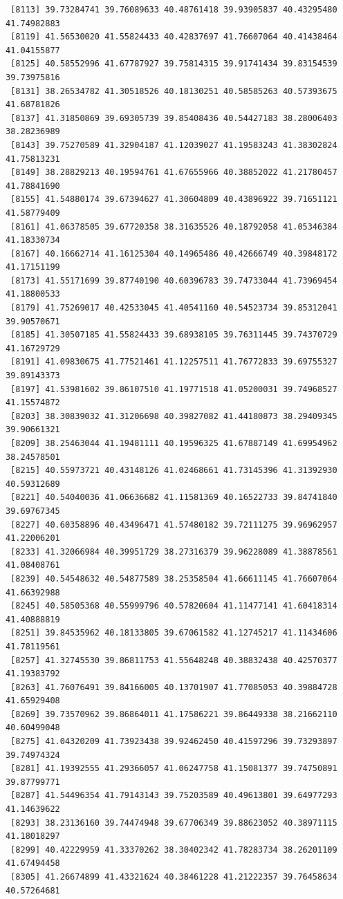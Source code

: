 \documentclass[
  letterpaper,
  DIV=11,
  numbers=noendperiod]{scrartcl}
\begin{document}
\begin{verbatim}
 [8113] 39.73284741 39.76089633 40.48761418 39.93905837 40.43295480 41.74982883
 [8119] 41.56530020 41.55824433 40.42837697 41.76607064 40.41438464 41.04155877
 [8125] 40.58552996 41.67787927 39.75814315 39.91741434 39.83154539 39.73975816
 [8131] 38.26534782 41.30518526 40.18130251 40.58585263 40.57393675 41.68781826
 [8137] 41.31850869 39.69305739 39.85408436 40.54427183 38.28006403 38.28236989
 [8143] 39.75270589 41.32904187 41.12039027 41.19583243 41.38302824 41.75813231
 [8149] 38.28829213 40.19594761 41.67655966 40.38852022 41.21780457 41.78841690
 [8155] 41.54880174 39.67394627 41.30604809 40.43896922 39.71651121 41.58779409
 [8161] 41.06378505 39.67720358 38.31635526 40.18792058 41.05346384 41.18330734
 [8167] 40.16662714 41.16125304 40.14965486 40.42666749 40.39848172 41.17151199
 [8173] 41.55171699 39.87740190 40.60396783 39.74733044 41.73969454 41.18800533
 [8179] 41.75269017 40.42533045 41.40541160 40.54523734 39.85312041 39.90570671
 [8185] 41.30507185 41.55824433 39.68938105 39.76311445 39.74370729 41.16729729
 [8191] 41.09830675 41.77521461 41.12257511 41.76772833 39.69755327 39.89143373
 [8197] 41.53981602 39.86107510 41.19771518 41.05200031 39.74968527 41.15574872
 [8203] 38.30839032 41.31206698 40.39827082 41.44180873 38.29409345 39.90661321
 [8209] 38.25463044 41.19481111 40.19596325 41.67887149 41.69954962 38.24578501
 [8215] 40.55973721 40.43148126 41.02468661 41.73145396 41.31392930 40.59312689
 [8221] 40.54040036 41.06636682 41.11581369 40.16522733 39.84741840 39.69767345
 [8227] 40.60358896 40.43496471 41.57480182 39.72111275 39.96962957 41.22006201
 [8233] 41.32066984 40.39951729 38.27316379 39.96228089 41.38878561 41.08408761
 [8239] 40.54548632 40.54877589 38.25358504 41.66611145 41.76607064 41.66392988
 [8245] 40.58505368 40.55999796 40.57820604 41.11477141 41.60418314 41.40888819
 [8251] 39.84535962 40.18133805 39.67061582 41.12745217 41.11434606 41.78119561
 [8257] 41.32745530 39.86811753 41.55648248 40.38832438 40.42570377 41.19383792
 [8263] 41.76076491 39.84166005 40.13701907 41.77085053 40.39884728 41.65929408
 [8269] 39.73570962 39.86864011 41.17586221 39.86449338 38.21662110 40.60499048
 [8275] 41.04320209 41.73923438 39.92462450 40.41597296 39.73293897 39.74974324
 [8281] 41.19392555 41.29366057 41.06247758 41.15081377 39.74750891 39.87799771
 [8287] 41.54496354 41.79143143 39.75203589 40.49613801 39.64977293 41.14639622
 [8293] 38.23136160 39.74474948 39.67706349 39.88623052 40.38971115 41.18018297
 [8299] 40.42229959 41.33370262 38.30402342 41.78283734 38.26201109 41.67494458
 [8305] 41.26674899 41.43321624 40.38461228 41.21222357 39.76458634 40.57264681

\end{verbatim}
\end{document}
